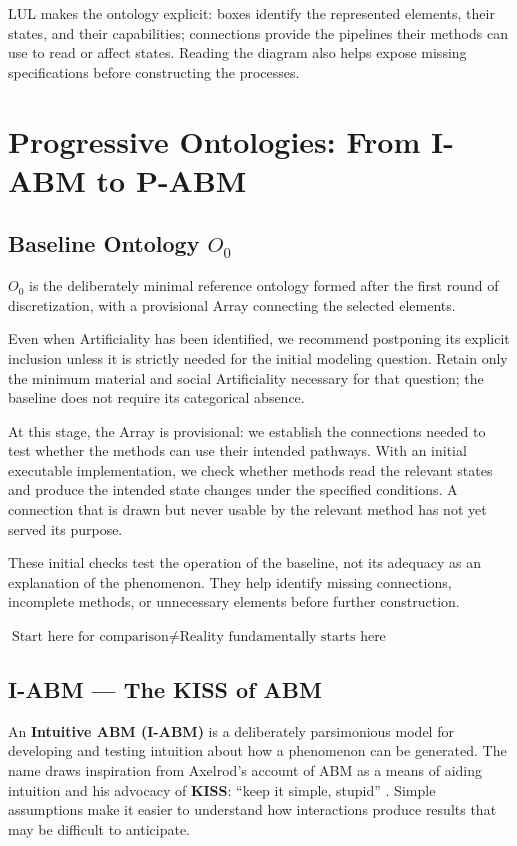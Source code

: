 \documentclass[11pt,a4paper]{article}
\newenvironment{fitdisplay}{\par\medskip\noindent\begin{lrbox}{\displaybox}$\displaystyle}{%
$\end{lrbox}\makebox[\linewidth][c]{\ifdim\wd\displaybox>\linewidth\resizebox{\linewidth}{!}{\usebox{\displaybox}}\else\usebox{\displaybox}\fi}\par\medskip}
\begin{document}
LUL makes the ontology explicit: boxes identify the represented elements, their states, and their capabilities; connections provide the pipelines their methods can use to read or affect states. Reading the diagram also helps expose missing specifications before constructing the processes.

\clearpage
\section{Progressive Ontologies: From I-ABM to P-ABM}

\subsection{Baseline Ontology \texorpdfstring{\(O_0\)}{O0}}

\(O_0\) is the deliberately minimal reference ontology formed after the first round of discretization, with a provisional Array connecting the selected elements.

Even when Artificiality has been identified, we recommend postponing its explicit inclusion unless it is strictly needed for the initial modeling question. Retain only the minimum material and social Artificiality necessary for that question; the baseline does not require its categorical absence.

At this stage, the Array is provisional: we establish the connections needed to test whether the methods can use their intended pathways. With an initial executable implementation, we check whether methods read the relevant states and produce the intended state changes under the specified conditions. A connection that is drawn but never usable by the relevant method has not yet served its purpose.

These initial checks test the operation of the baseline, not its adequacy as an explanation of the phenomenon. They help identify missing connections, incomplete methods, or unnecessary elements before further construction.

\begin{fitdisplay}
\boxed{
\text{Start here for comparison}
\neq
\text{Reality fundamentally starts here}
}
\end{fitdisplay}

\subsection{I-ABM --- The KISS of ABM}

An \textbf{Intuitive ABM (I-ABM)} is a deliberately parsimonious model for developing and testing intuition about how a phenomenon can be generated. The name draws inspiration from Axelrod's account of ABM as a means of aiding intuition and his advocacy of \textbf{KISS}: ``keep it simple, stupid'' \cite[pp.~4--6]{axelrod_complexity_1997}. Simple assumptions make it easier to understand how interactions produce results that may be difficult to anticipate.
\end{document}
